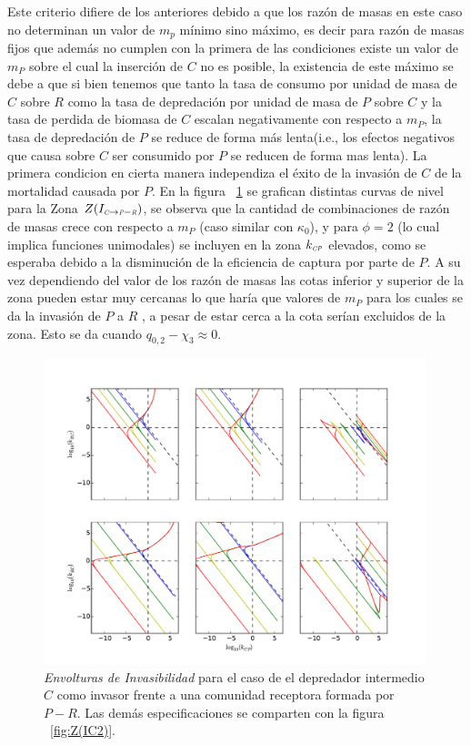 Este criterio difiere de los anteriores debido a que los raz\'on de masas en este caso no determinan un valor de $m_p$ m\'inimo sino m\'aximo, es decir para raz\'on de masas fijos que adem\'as no cumplen con la primera de las condiciones existe un valor de $m_P$ sobre el cual la inserci\'on de $C$ no es posible, la existencia de este m\'aximo se debe a que si bien tenemos que tanto la tasa de consumo por unidad de masa de $C$ sobre $R$ como la tasa de depredaci\'on por unidad de masa de $P$ sobre $C$ y la tasa de perdida de biomasa de $C$ escalan negativamente con respecto a $m_P$, la tasa de depredaci\'on de $P$ se reduce de forma m\'as lenta(i.e., los efectos negativos que causa sobre $C$ ser consumido por $P$ se reducen de forma mas lenta). La primera condicion en cierta manera independiza el \'exito de la invasi\'on de $C$ de la mortalidad causada por $P$. En la figura ~\ref{fig:Z(IC5)} se grafican distintas curvas de nivel para la Zona $Z(I_{\textit{\tiny C} \to \textit{\tiny P}-\textit{\tiny R}})$, se observa que la cantidad de combinaciones de raz\'on de masas crece con respecto a $m_P$ (caso similar con $\kappa_0$), y para $\phi = 2$ (lo cual implica funciones unimodales) se incluyen en la zona $k_{\textit{\tiny CP}}$ elevados, como se esperaba debido a la disminuci\'on de la eficiencia de captura por parte de $P$. A su vez dependiendo del valor de los raz\'on de masas las cotas inferior y superior de la zona pueden estar muy cercanas lo que har\'ia que valores de $m_P$ para los cuales se da la invasi\'on de $P$ a $R$ , a pesar de estar cerca a la cota ser\'ian excluidos de la zona. Esto se da cuando $ q_{0,2} - \chi_3 \approx 0$.


\begin{figure}
  \centering
  \includegraphics[width = 0.99\textwidth]{./Plots/Z(IC5)AcGrGr.pdf}
  \caption[Env $Z(IC5)$]{\emph{Envolturas de Invasibilidad} para el caso de el depredador intermedio $C$ como invasor frente a una comunidad receptora formada por $P-R$. Las dem\'as especificaciones se comparten con la figura ~\ref{fig:Z(IC2)}.}
  \label{fig:Z(IC5)}
\end{figure}

